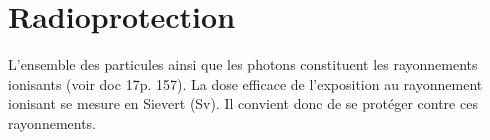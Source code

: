 \section{Radioprotection}

L'ensemble des particules ainsi que les photons constituent les rayonnements ionisants (voir doc 17p. 157). La dose efficace de l'exposition au rayonnement ionisant se mesure en Sievert (Sv). Il convient donc de se protéger contre ces rayonnements. \par
